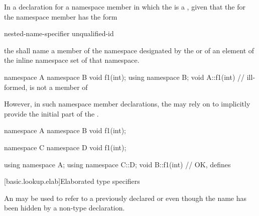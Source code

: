 \pnum
In a declaration for a namespace member in which the
 is a , given that the
 for the namespace member has the form
\begin{ncbnf}
nested-name-specifier unqualified-id
\end{ncbnf}
the
 shall name a member of the namespace
designated by the 
or of an element of the inline namespace set of that namespace.
\begin{example}
\begin{codeblock}
namespace A {
  namespace B {
    void f1(int);
  }
  using namespace B;
}
void A::f1(int){ }  // ill-formed,  is not a member of 
\end{codeblock}
\end{example}
However, in such namespace member declarations, the
 may rely on 
to implicitly provide the initial part of the
.
\begin{example}
\begin{codeblock}
namespace A {
  namespace B {
    void f1(int);
  }
}

namespace C {
  namespace D {
    void f1(int);
  }
}

using namespace A;
using namespace C::D;
void B::f1(int){ }  // OK, defines 
\end{codeblock}
\end{example}
%

[basic.lookup.elab]{Elaborated type specifiers}%
%

\pnum
An  may be
used to refer to a previously declared  or
 even though the name has been hidden by a non-type
declaration.

